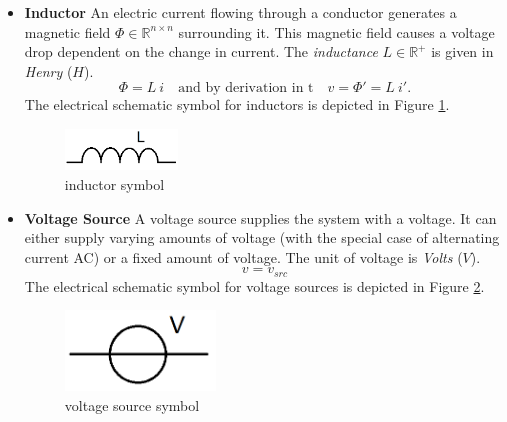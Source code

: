 \begin{itemize}
	\item \textbf{Inductor} \newline
	An electric current flowing through a conductor generates a magnetic field $\Phi \in \mathbb{R}^{n \times n}$ surrounding it. This magnetic field causes a voltage drop dependent on the change in current. The \emph{inductance} $L \in \mathbb{R}^+$ is given in \emph{Henry} ($H$).
	\begin{equation}
		\label{eq:inductor law}
		\Phi = L \ i \quad \text{and by derivation in t} \quad v = \Phi' = L \ i'.
	\end{equation}
	The electrical schematic symbol for inductors is depicted in Figure \ref{fig:inductor symbol}.
	\begin{figure}[H]
		\label{fig:inductor symbol}
		\centering
		\includegraphics[width=3cm]{pictures/inductance.png}
		\caption{inductor symbol}
	\end{figure}

	\item \textbf{Voltage Source} \newline
	A voltage source supplies the system with a voltage. It can either supply varying amounts of voltage (with the special case of alternating current AC) or a fixed amount of voltage. The unit of voltage is \emph{Volts} ($V$).
	\begin{equation}
		\label{eq:voltage source law}
		v = v_{src}
	\end{equation}
	The electrical schematic symbol for voltage sources is depicted in Figure \ref{fig:voltage source symbol}.
	\begin{figure}[H]
		\label{fig:voltage source symbol}
		\centering
		\includegraphics[width=4cm]{pictures/voltage_source.png}
		\caption{voltage source symbol}
	\end{figure}


\end{itemize}
